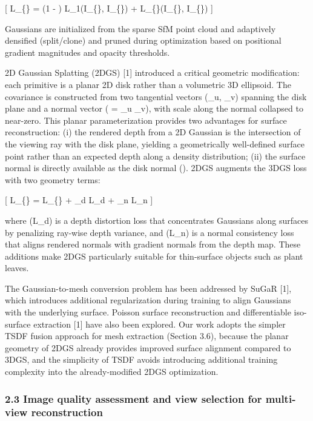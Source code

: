 \documentclass[11pt,a4paper]{article}
\begin{document}
{[} L\_\{\} = (1 - \lambda) L\_1(I\_\{\},
I\_\{\}) + \lambda L\_\{\}(I\_\{\},
I\_\{\}) {]}

Gaussians are initialized from the sparse SfM point cloud and adaptively
densified (split/clone) and pruned during optimization based on
positional gradient magnitudes and opacity thresholds.

2D Gaussian Splatting (2DGS) {[}1{]} introduced a critical geometric
modification: each primitive is a planar 2D disk rather than a
volumetric 3D ellipsoid. The covariance is constructed from two
tangential vectors (\_u, \_v) spanning the disk
plane and a normal vector ( = \_u
\times {}\_v), with scale along the normal collapsed to
near-zero. This planar parameterization provides two advantages for
surface reconstruction: (i) the rendered depth from a 2D Gaussian is the
intersection of the viewing ray with the disk plane, yielding a
geometrically well-defined surface point rather than an expected depth
along a density distribution; (ii) the surface normal is directly
available as the disk normal (). 2DGS augments the 3DGS loss
with two geometry terms:

{[} L\_\{\} = L\_\{\} + \lambda\_d L\_d +
\lambda\_n L\_n {]}

where (L\_d) is a depth distortion loss that concentrates Gaussians
along surfaces by penalizing ray-wise depth variance, and (L\_n) is a
normal consistency loss that aligns rendered normals with gradient
normals from the depth map. These additions make 2DGS particularly
suitable for thin-surface objects such as plant leaves.

The Gaussian-to-mesh conversion problem has been addressed by SuGaR
{[}1{]}, which introduces additional regularization during training to
align Gaussians with the underlying surface. Poisson surface
reconstruction and differentiable iso-surface extraction {[}1{]} have
also been explored. Our work adopts the simpler TSDF fusion approach for
mesh extraction (Section 3.6), because the planar geometry of 2DGS
already provides improved surface alignment compared to 3DGS, and the
simplicity of TSDF avoids introducing additional training complexity
into the already-modified 2DGS optimization.

\subsubsection{2.3 Image quality assessment and view selection for
multi-view
reconstruction}\label{image-quality-assessment-and-view-selection-for-multi-view-reconstruction}
\end{document}
